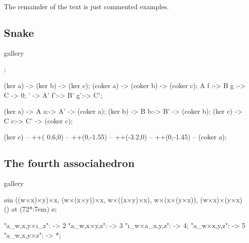 
The remainder of the text is just commented examples.

\clearpage

\subsection{Snake}

\begin{tcblisting}{gallery}
\begin{kodi}[golden]
  ;

  \mor   (ker a) ->   (ker b) ->   (ker c);
  \mor (coker a) -> (coker b) -> (coker c);
  \mor       A  f :-> B  g :-> C -> 0;
  ' -> A' f':-> B' g':-> C';

   (ker a) -> A a:-> A' -> (coker a);
   (ker b) -> B b:-> B' -> (coker b);
   (ker c) -> C c:-> C' -> (coker c);

  \draw[/kD/arrows/crossing over, ->, rounded corners, >=stealth]
    (ker c) -- ++( 0.6,0) -- ++(0,-1.55)
            -- ++(-3.2,0) -- ++(0,-1.45) -- (coker a);
\end{kodi}
\end{tcblisting}

\clearpage

\subsection{The fourth associahedron}

\begin{tcblisting}{gallery}
\begin{kodi}

  \foreach [count=\n] \o in {
      ((w×x)×y)×x,
      (w×(x×y))×x,
      w×((x×y)×x),
      w×(x×(y×x)),
      (w×x)×(y×x)
    } \obj (\n) at (72*\n:7em) {\o};

   "a_{w,x,y}×ı_z": -> 2
           "a_{w,x×y,z}": -> 3
         "ı_w×a_{x,y,z}": -> 4;
  \mor *   "a_{w×x,y,z}": -> 5
           "a_{w,x,y×z}": -> *;
\end{kodi}
\end{tcblisting}

